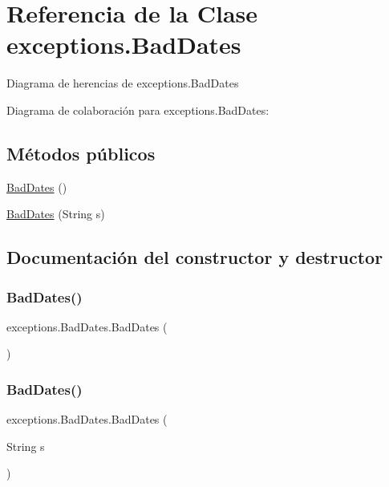 \hypertarget{classexceptions_1_1_bad_dates}{}\section{Referencia de la Clase exceptions.\+Bad\+Dates}
\label{classexceptions_1_1_bad_dates}


Diagrama de herencias de exceptions.\+Bad\+Dates


Diagrama de colaboración para exceptions.\+Bad\+Dates\+:
\subsection*{Métodos públicos}
\begin{DoxyCompactItemize}
\item 
\mbox{\hyperlink{classexceptions_1_1_bad_dates_ad4918ff10b5e46df93774ea9087e6d04}{Bad\+Dates}} ()
\item 
\mbox{\hyperlink{classexceptions_1_1_bad_dates_a34213c984892e85612e3a2e44220e896}{Bad\+Dates}} (String s)
\end{DoxyCompactItemize}


\subsection{Documentación del constructor y destructor}
\mbox{\label{classexceptions_1_1_bad_dates_ad4918ff10b5e46df93774ea9087e6d04}} 
\subsubsection{\texorpdfstring{BadDates()}{BadDates()}\hspace{0.1cm}{\footnotesize\ttfamily [1/2]}}
{\footnotesize\ttfamily exceptions.\+Bad\+Dates.\+Bad\+Dates (\begin{DoxyParamCaption}{ }\end{DoxyParamCaption})}

\mbox{\label{classexceptions_1_1_bad_dates_a34213c984892e85612e3a2e44220e896}} 
\subsubsection{\texorpdfstring{BadDates()}{BadDates()}\hspace{0.1cm}{\footnotesize\ttfamily [2/2]}}
{\footnotesize\ttfamily exceptions.\+Bad\+Dates.\+Bad\+Dates (\begin{DoxyParamCaption}\item[{String}]{s }\end{DoxyParamCaption})}

